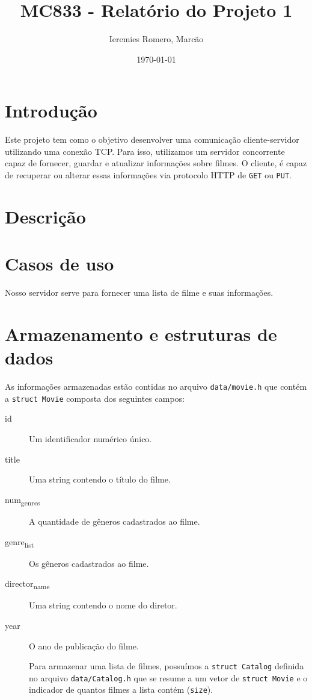 \documentclass[11pt]{article}
\author{Ieremies Romero, Marcão}
\date{\today}
\title{MC833 - Relatório do Projeto 1}
\theoremstyle{definition}
\theoremstyle{definition}
\theoremstyle{remark}
\theoremstyle{remark}
\theoremstyle{remark}
\theoremstyle{remark}
\theoremstyle{definition}
\begin{document}
\maketitle
\tableofcontents


\section{Introdução}
\label{sec:org063043b}
Este projeto tem como o objetivo desenvolver uma comunicação cliente-servidor utilizando uma conexão TCP. Para isso, utilizamos um servidor concorrente capaz de fornecer, guardar e atualizar informações sobre filmes. O cliente, é capaz de recuperar ou alterar essas informações via protocolo HTTP de \texttt{GET} ou \texttt{PUT}.
\section{Descrição}
\label{sec:org3c377cb}


\section{Casos de uso}
\label{sec:org0ad9fc9}
Nosso servidor serve para fornecer uma lista de filme e suas informações.
\section{Armazenamento e estruturas de dados}
\label{sec:orgbcfd810}
As informações armazenadas estão contidas no arquivo \texttt{data/movie.h} que contém a \texttt{struct Movie} composta dos seguintes campos:
\begin{description}
\item[{id}] Um identificador numérico único.
\item[{title}] Uma string contendo o título do filme.
\item[{num\textsubscript{genres}}] A quantidade de gêneros cadastrados ao filme.
\item[{genre\textsubscript{list}}] Os gêneros cadastrados ao filme.
\item[{director\textsubscript{name}}] Uma string contendo o nome do diretor.
\item[{year}] O ano de publicação do filme.

Para armazenar uma lista de filmes, possuímos a \texttt{struct Catalog} definida no arquivo \texttt{data/Catalog.h} que se resume a um vetor de \texttt{struct Movie} e o indicador de quantos filmes a lista contém (\texttt{size}).
\end{description}
\end{document}
